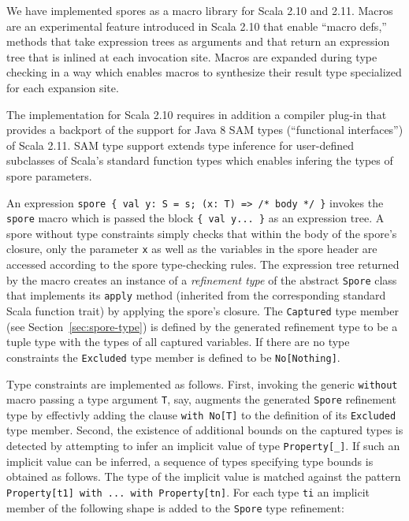 \documentclass[runningheads]{llncs}
\begin{document}
\begin{sloppypar}
We have implemented spores as a macro library for Scala 2.10 and 2.11. Macros are an experimental feature introduced in Scala 2.10 that enable ``macro defs,'' methods that take expression trees as arguments and that return an expression tree that is inlined at each invocation site. Macros are expanded during type checking in a way which enables macros to synthesize their result type specialized for each expansion site.

The implementation for Scala 2.10 requires in addition a compiler plug-in that provides a backport of the support for Java 8 SAM types (``functional interfaces'') of Scala 2.11. SAM type support extends type inference for user-defined subclasses of Scala's standard function types which enables infering the types of spore parameters.

An expression \verb|spore { val y: S = s; (x: T) => /* body */ }| invokes the \verb|spore| macro which is passed the block \verb|{ val y... }| as an expression tree. A spore without type constraints simply checks that within the body of the spore's closure, only the parameter \verb|x| as well as the variables in the spore header are accessed according to the spore type-checking rules. The expression tree returned by the macro creates an instance of a {\em refinement type} of the abstract \verb|Spore| class that implements its \verb|apply| method (inherited from the corresponding standard Scala function trait) by applying the spore's closure. The \verb|Captured| type member (see Section~\ref{sec:spore-type}) is defined by the generated refinement type to be a tuple type with the types of all captured variables. If there are no type constraints the \verb|Excluded| type member is defined to be \verb|No[Nothing]|.

Type constraints are implemented as follows. First, invoking the generic \verb|without| macro passing a type argument \verb|T|, say, augments the generated \verb|Spore| refinement type by effectivly adding the clause \verb|with No[T]| to the definition of its \verb|Excluded| type member. Second, the existence of additional bounds on the captured types is detected by attempting to infer an implicit value of type \verb|Property[_]|. If such an implicit value can be inferred, a sequence of types specifying type bounds is obtained as follows. The type of the implicit value is matched against the pattern \verb|Property[t1] with ... with Property[tn]|. For each type \verb|ti| an implicit member of the following shape is added to the \verb|Spore| type refinement:


\end{sloppypar}
\end{document}
